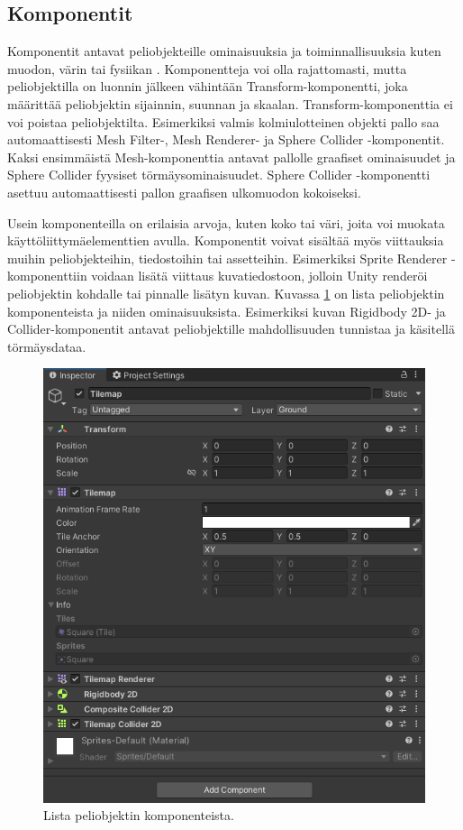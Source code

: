 \documentclass[utf8]{gradu3}
\begin{document}
\subsection{Komponentit}

Komponentit antavat peliobjekteille ominaisuuksia ja toiminnallisuuksia kuten muodon, värin tai fysiikan \parencite{unitydoccomp}. Komponentteja voi olla rajattomasti, mutta peliobjektilla on luonnin jälkeen vähintään Transform-komponentti, joka määrittää peliobjektin sijainnin, suunnan ja skaalan. Transform-komponenttia ei voi poistaa peliobjektilta. Esimerkiksi valmis kolmiulotteinen objekti pallo saa automaattisesti Mesh Filter-, Mesh Renderer- ja Sphere Collider -komponentit. Kaksi ensimmäistä Mesh-komponenttia antavat pallolle graafiset ominaisuudet ja Sphere Collider fyysiset törmäysominaisuudet. Sphere Collider -komponentti asettuu automaattisesti pallon graafisen ulkomuodon kokoiseksi.

Usein komponenteilla on erilaisia arvoja, kuten koko tai väri, joita voi muokata käyttöliittymäelementtien avulla. Komponentit voivat sisältää myös viittauksia muihin peliobjekteihin, tiedostoihin tai assetteihin. Esimerkiksi Sprite Renderer -komponenttiin voidaan lisätä viittaus kuvatiedostoon, jolloin Unity renderöi peliobjektin kohdalle tai pinnalle lisätyn kuvan. Kuvassa \ref{komponenttikuva} on lista peliobjektin komponenteista ja niiden ominaisuuksista. Esimerkiksi kuvan Rigidbody 2D- ja Collider-komponentit antavat peliobjektille mahdollisuuden tunnistaa ja käsitellä törmäysdataa.

\begin{figure}[t]
\centering
\includegraphics[width=12cm]{komponenttilistaus.png}
\caption{Lista peliobjektin komponenteista.}
\label{komponenttikuva}
\end{figure}
\end{document}
